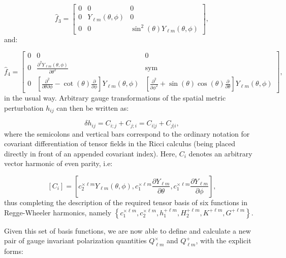 \documentclass{article}
\begin{document}
\begin{equation}
\hat{f}_3 = \begin{bmatrix}
0 & 0 & 0\\
0 & Y_{\ell m} \left( \theta, \phi \right) & 0\\
0 & 0 & \sin^2 \left( \theta \right) Y_{\ell m} \left( \theta, \phi \right)
\end{bmatrix},
\end{equation}
and:

\begin{equation}
\hat{f}_4 = \begin{bmatrix}
0 & 0 & 0\\
0 & \frac{\partial^2 Y_{\ell m} \left( \theta, \phi \right)}{\partial \theta^2} & \mathrm{sym}\\
0 & \left[ \frac{\partial^2}{\partial \theta \partial \phi} - \cot \left( \theta \right) \frac{\partial}{\partial \phi} \right] Y_{\ell m} \left( \theta, \phi \right) & \left[ \frac{\partial^2}{\partial \phi^2} + \sin \left( \theta \right) \cos \left( \theta \right) \frac{\partial}{\partial \theta} \right] Y_{\ell m} \left( \theta, \phi \right)
\end{bmatrix},
\end{equation}
in the usual way. Arbitrary gauge transformations of the spatial metric perturbation ${h_{i j}}$ can then be written as:

\begin{equation}
\delta h_{i j} = C_{i ; j} + C_{j ; i} = C_{i \vert j} + C_{j \vert i},
\end{equation}
where the semicolons and vertical bars correspond to the ordinary notation for covariant differentiation of tensor fields in the Ricci calculus (being placed directly in front of an appended covariant index). Here, ${C_i}$ denotes an arbitrary vector harmonic of even parity, i.e:

\begin{equation}
\left[ C_i \right] = \left[ c_{2}^{\times \ell m} Y_{\ell m} \left( \theta, \phi \right), c_{1}^{\times \ell m} \frac{\partial Y_{\ell m}}{\partial \theta}, c_{1}^{\times \ell m} \frac{\partial Y_{\ell m}}{\partial \phi} \right],
\end{equation}
thus completing the description of the required tensor basis of six functions in Regge-Wheeler harmonics, namely ${\left\lbrace c_{1}^{\times \ell m}, c_{2}^{\times \ell m}, h_{1}^{+ \ell m}, H_{2}^{+ \ell m}, K^{+ \ell m}, G^{+ \ell m} \right\rbrace}$.

Given this set of basis functions, we are now able to define and calculate a new pair of gauge invariant polarization quantities ${Q_{\ell m}^{\times}}$ and ${Q_{\ell m}^{+}}$, with the explicit forms:
\end{document}
